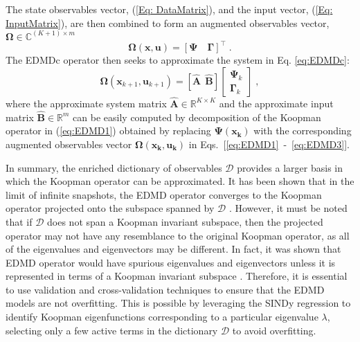 The state observables vector, (\ref{Eq: DataMatrix}), and the input vector, (\ref{Eq: InputMatrix}), are then combined to form an augmented observables vector, $\mathbf{\Omega} \in \mathbb{C}^{(K+1) \times {m}} $
% 
\begin{equation}
    \mathbf{\Omega(x,u)} = [ \mathbf{\Psi} \quad \mathbf{\Gamma}]^\top \;.
\end{equation}
%
The EDMDc operator then seeks to approximate the system in Eq. \ref{eq:EDMDc}:
% 
\begin{equation}
    \mathbf{\Omega}(\mathbf{x}_{k+1},\mathbf{u}_{k+1}) = [\mathbf{\hat{A}~~\hat{B}}]\begin{bmatrix}
    \mathbf{\Psi}_k \\ \mathbf{\Gamma}_k
    \end{bmatrix}\;,
\end{equation}
% 
where the approximate system matrix $\mathbf{\hat{A}} \in \mathbb{R}^{K\times K}$ and the approximate input matrix $\mathbf{\hat{B}} \in \mathbb{R}^m$ can be easily computed by decomposition of the Koopman operator in (\ref{eq:EDMD1}) obtained by replacing $\mathbf{\Psi(x_k)}$ with the corresponding augmented observables vector $\mathbf{\Omega(x_k,u_k)}$ in Eqs.~[\ref{eq:EDMD1}~-~\ref{eq:EDMD3}].
\par
In summary, the enriched dictionary of observables $\mathcal{D}$ provides a larger basis in which the Koopman operator can be approximated. It has been shown that in the limit of infinite snapshots, the EDMD operator converges to the Koopman operator projected onto the subspace spanned by $\mathcal{D}$ \cite{Korda_edmd_conv}. However, it must be noted that if $\mathcal{D}$ does not span a Koopman invariant subspace, then the projected operator may not have any resemblance to the original Koopman operator, as all of the eigenvalues and eigenvectors may be different. In fact, it was shown that EDMD operator would have spurious eigenvalues and eigenvectors unless it is represented in terms of a Koopman invariant subspace \cite{Brunton_K_invariant_sub}. Therefore, it is essential to use validation and cross-validation techniques to ensure that the EDMD models are not overfitting. This is possible by leveraging the SINDy regression \cite{SINDy} to identify Koopman eigenfunctions corresponding to a particular eigenvalue $\lambda$, selecting only a few active terms in the dictionary $\mathcal{D}$ to avoid overfitting. 
\newpage